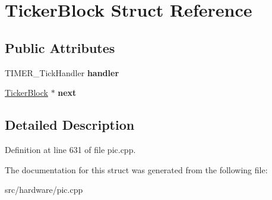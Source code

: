 \hypertarget{structTickerBlock}{\section{Ticker\-Block Struct Reference}
\label{structTickerBlock}
}
\subsection*{Public Attributes}
\begin{DoxyCompactItemize}
\item 
\hypertarget{structTickerBlock_a988263e8ab525b52670e556aece5f427}{T\-I\-M\-E\-R\-\_\-\-Tick\-Handler {\bfseries handler}}\label{structTickerBlock_a988263e8ab525b52670e556aece5f427}

\item 
\hypertarget{structTickerBlock_a291819bf28ca00f5d7c0a26d1f771e8b}{\hyperlink{structTickerBlock}{Ticker\-Block} $\ast$ {\bfseries next}}\label{structTickerBlock_a291819bf28ca00f5d7c0a26d1f771e8b}

\end{DoxyCompactItemize}


\subsection{Detailed Description}


Definition at line 631 of file pic.\-cpp.



The documentation for this struct was generated from the following file\-:\begin{DoxyCompactItemize}
\item 
src/hardware/pic.\-cpp\end{DoxyCompactItemize}
